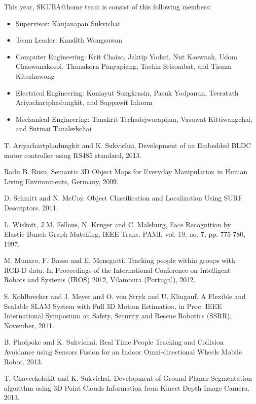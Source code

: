 \documentclass{llncs}
\begin{document}
This year, SKUBA@home team is consist of this following members:
\begin{itemize}
\item Supervisor: Kanjanapan Sukvichai
\item Team Leader: Kandith Wongsuwan
\item Computer Engineering: Krit Chaiso, Jaktip Yodsri, Nut Kaewnak, Udom Chaowanakosol, Thanakorn Panyapiang, Tachin Srisombat, and Tisana Kitsahawong
\item Electrical Engineering: Konlayut Songkrasin, Pasuk Yodpanun, Teeratath Ariyachartphadungkit, and Suppawit Inhorm
\item Mechanical Engineering: Tanakrit Techadejworaphun, Vasuwat Kittiwangchai, and Sutinai Tanalerkchai
\end{itemize}
\begin{thebibliography}{4}

 T. Ariyachartphadungkit and K. Sukvichai, Development of an Embedded BLDC motor controller using RS485 standard, 2013.

 Radu B. Rusu, 
Semantic 3D Object Maps for Everyday Manipulation in Human Living Environments, Germany, 2009.

 D. Schmitt and N. McCoy. Object Classification and Localization Using SURF Descriptors. 2011.

 L. Wiskott, J.M. Fellous, N. Kruger and C. Malsburg, Face Recognition by Elastic Bunch Graph Matching, IEEE Trans. PAMI, vol. 19, no. 7, pp. 775-780, 1997. 

 M. Munaro, F. Basso and E. Menegatti. Tracking people within groups with RGB-D data. In Proceedings of the International Conference on Intelligent Robots and Systems (IROS) 2012, Vilamoura (Portugal), 2012.

 S. Kohlbrecher and J. Meyer and O. von Stryk and U. Klingauf. A Flexible and Scalable SLAM System with Full 3D Motion Estimation, in Proc. IEEE International Symposium on Safety, Security and Rescue Robotics (SSRR), November, 2011.

 B. Pholpoke and K. Sukvichai. Real Time People Tracking and Collision Avoidance using Sensors Fusion for an Indoor Omni-directional Wheels Mobile Robot, 2013.

 T. Chaveekolakit and K. Sukvichai. Development of Ground Planar Segmentation algorithm using 3D Point Clouds Information from Kinect Depth Image Camera, 2013.

\end{thebibliography}
\end{document}
